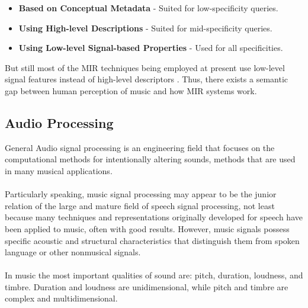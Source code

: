 \begin{itemize}
        \item \textbf{Based on Conceptual Metadata} - Suited for low-specificity queries.

        \item \textbf{Using High-level Descriptions} - Suited for mid-specificity queries.

        \item \textbf{Using Low-level Signal-based Properties} - Used for all specificities.

\end{itemize}

But still most of the MIR techniques being employed at present use low-level signal features instead of high-level descriptors \cite{Kaminskas2012}.
Thus, there exists a semantic gap between human perception of music and how MIR systems work.

\subsection{Audio Processing}

General Audio signal processing is an engineering field that focuses on the computational methods for intentionally altering sounds, methods that
are used in many musical applications.\\
\\
Particularly speaking, music signal processing may appear to be the junior relation of the large and mature field of speech signal processing,
not least because many techniques and representations originally developed for speech have been applied to music, often with good results. However,
music signals possess specific acoustic and structural characteristics that distinguish them from spoken language or other nonmusical signals. \cite{muller2011}\\
\\
In music the most important qualities of sound are: pitch, duration, loudness, and timbre. Duration and loudness are unidimensional, while pitch and timbre are complex and multidimensional. \cite{dooling2014}

